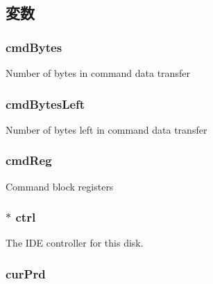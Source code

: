 \subsection{変数}
\hypertarget{classIdeDisk_a732862da3f80cd2b8eaba9425c8415f5}{
\subsubsection[{cmdBytes}]{ {\bf cmdBytes}}}
\label{classIdeDisk_a732862da3f80cd2b8eaba9425c8415f5}
Number of bytes in command data transfer \hypertarget{classIdeDisk_a70940fc29adad666da15b3d4c11ac2ff}{
\subsubsection[{cmdBytesLeft}]{ {\bf cmdBytesLeft}}}
\label{classIdeDisk_a70940fc29adad666da15b3d4c11ac2ff}
Number of bytes left in command data transfer \hypertarget{classIdeDisk_a2d468138409fc099c81da8d9b62f1f0f}{
\subsubsection[{cmdReg}]{ {\bf cmdReg}}}
\label{classIdeDisk_a2d468138409fc099c81da8d9b62f1f0f}
Command block registers \hypertarget{classIdeDisk_a15da11d9f856cf2edfc6ed93e24ad0ea}{
\subsubsection[{ctrl}]{$\ast$ {\bf ctrl}}}
\label{classIdeDisk_a15da11d9f856cf2edfc6ed93e24ad0ea}
The IDE controller for this disk. \hypertarget{classIdeDisk_a550dda68894801d065c57391335a8590}{
\subsubsection[{curPrd}]{ {\bf curPrd}}}
